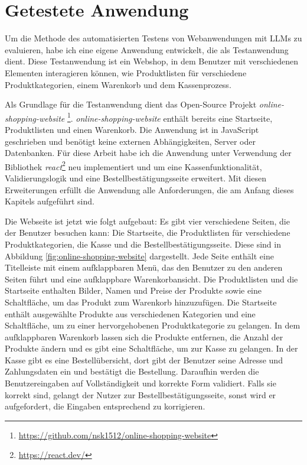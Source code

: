 \section{Getestete Anwendung}

Um die Methode des automatisierten Testens von Webanwendungen mit LLMs zu evaluieren, habe ich eine eigene Anwendung entwickelt, die als Test\-anwendung dient.
Diese Testanwendung ist ein Webshop, in dem Benutzer mit verschiedenen Elementen interagieren können, wie Produktlisten für verschiedene Produktkategorien, einem Warenkorb und dem Kassenprozess.

Als Grundlage für die Testanwendung dient das Open-Source Projekt \textit{online-shopping-website} \footnote{\url{https://github.com/nsk1512/online-shopping-website}}.
\textit{online-shopping-website} enthält bereits eine Startseite, Produktlisten und einen Warenkorb.
Die Anwendung ist in JavaScript geschrieben und benötigt keine externen Abhängigkeiten, Server oder Datenbanken.
Für diese Arbeit habe ich die Anwendung unter Verwendung der Bibliothek \textit{react}\footnote{\url{https://react.dev/}} neu implementiert und um eine Kassenfunktionalität, Validierungslogik und eine Bestellbestätigungsseite erweitert.
Mit diesen Erweiterungen erfüllt die Anwendung alle Anforderungen, die am Anfang dieses Kapitels aufgeführt sind.


Die Webseite ist jetzt wie folgt aufgebaut:
Es gibt vier verschiedene Seiten, die der Benutzer besuchen kann: Die Startseite, die Produktlisten für verschiedene Produktkategorien, die Kasse und die Bestellbestätigungsseite.
Diese sind in Abbildung \ref{fig:online-shopping-website} dargestellt.
Jede Seite enthält eine Titelleiste mit einem aufklappbaren Menü, das den Benutzer zu den anderen Seiten führt und eine aufklappbare Warenkorbansicht.
Die Produktlisten und die Startseite enthalten Bilder, Namen und Preise der Produkte sowie eine Schaltfläche, um das Produkt zum Warenkorb hinzuzufügen.
Die Startseite enthält ausgewählte Produkte aus verschiedenen Kategorien und eine Schaltfläche, um zu einer hervorgehobenen Produktkategorie zu gelangen.
In dem aufklappbaren Warenkorb lassen sich die Produkte entfernen, die Anzahl der Produkte ändern und es gibt eine Schaltfläche, um zur Kasse zu gelangen.
In der Kasse gibt es eine Bestellübersicht, dort gibt der Benutzer seine Adresse und Zahlungsdaten ein und bestätigt die Bestellung.
Daraufhin werden die Benutzereingaben auf Vollständigkeit und korrekte Form validiert.
Falls sie korrekt sind, gelangt der Nutzer zur Bestellbestätigungsseite, sonst wird er aufgefordert, die Eingaben entsprechend zu korrigieren.

